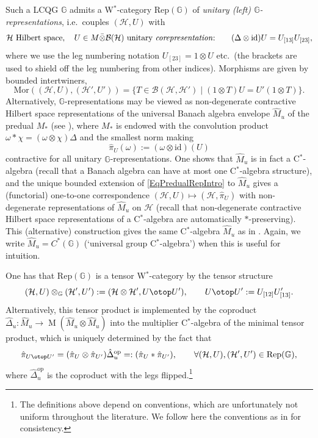 \documentclass[reqno]{amsart}
\numberwithin{equation}{section}
\newcommand{\mcB}{\mathcal{B}}
\newcommand{\id}{\mathrm{id}}
\newcommand{\Hsp}{\mathcal{H}}
\newcommand{\G}{\mathbb{G}}
\newcommand{\opp}{\mathrm{op}}
\newcommand{\Rep}{\mathrm{Rep}}
\newcommand{\Mult}{\operatorname{M}}
\newcommand{\TensRep}{\otop}
\begin{document}
Such a  LCQG $\G$ admits a W$^*$-category $\Rep(\G)$ of \emph{unitary (left) $\G$-representations}, i.e.~couples $(\Hsp,U)$ with
\begin{equation}\label{EqUnitRepDef}
\Hsp \textrm{ Hilbert space},\quad U \in M\bar{\otimes} \mcB(\Hsp) \textrm{ unitary \emph{corepresentation}:}\qquad(\Delta\otimes \id)U = U_{[13]}U_{[23]},
\end{equation}
where we use the leg numbering notation $U_{[23]} = 1\otimes U$ etc.\ (the brackets are used to shield off the leg numbering from other indices). Morphisms are given by bounded intertwiners, 
\[
\mathrm{Mor}((\Hsp,U),(\Hsp',U')) = \{T \in \mathcal{B}(\Hsp,\Hsp')\mid (1\otimes T)U = U'(1\otimes T)\}.
\]
Alternatively,  $\G$-representations may be viewed as non-degenerate contractive Hilbert space representations of the universal Banach algebra envelope $\hat{M}_u$ of the predual $M_*$ (see \cite{Kus01}), where $M_*$ is endowed with the convolution product $\omega*\chi = (\omega\otimes \chi)\Delta$ and the smallest norm  making
\begin{equation}\label{EqPredualRepIntro}
\hat{\pi}_U(\omega) := (\omega \otimes \id)(U)
\end{equation}
contractive for all unitary $\G$-representations. One shows that $\hat{M}_u$ is in fact a C$^*$-algebra (recall that a Banach algebra can have at most one C$^*$-algebra structure), and the unique bounded extension of \eqref{EqPredualRepIntro} to $\hat{M}_u$ gives a (functorial) one-to-one correspondence $(\Hsp,U) \mapsto (\Hsp,\hat{\pi}_U)$ with non-degenerate representations of $\hat{M}_u$ on $\Hsp$ (recall that non-degenerate contractive Hilbert space representations of a C$^*$-algebra are automatically $*$-preserving). This (alternative) construction gives the same C$^*$-algebra $\hat{M}_u$ as in \cite{Kus01}. Again, we write $\hat{M}_u = C^*(\G)$ (`universal group C$^*$-algebra') when this is useful for intuition.

One has that $\Rep(\G)$ is a tensor W$^*$-category by the tensor structure
\begin{equation}\label{EqTensProd1}
(\Hsp,U) \otimes_{\G} (\Hsp',U') := (\Hsp\otimes \Hsp',U \TensRep U'),\qquad U \TensRep U' := U_{[12]}U_{[13]}'. 
\end{equation}
Alternatively, this tensor product is implemented by the coproduct $\hat{\Delta}_u\colon \hat{M}_u\rightarrow \Mult(\hat{M}_u\otimes \hat{M}_u)$ into the multiplier C$^*$-algebra of the minimal tensor product, which is uniquely determined by the fact that
\[
\hat{\pi}_{U\TensRep U'} = (\hat{\pi}_U \otimes \hat{\pi}_{U'})\hat{\Delta}_u^{\opp} =: (\hat{\pi}_U*\hat{\pi}_{U'}), \qquad \forall (\Hsp,U),(\Hsp',U') \in \Rep(\G),
\]
where $\hat{\Delta}_u^{\opp}$ is the coproduct with the legs flipped.\footnote{The definitions above depend on conventions, which are unfortunately not uniform throughout the literature. We follow here the conventions as in \cite{DCKr24} for consistency.}
\end{document}
